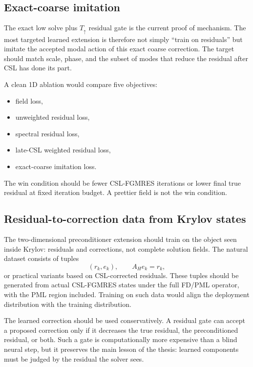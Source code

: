 \subsection{Exact-coarse imitation}
\label{subsec:discussion-future-exact-coarse}

The exact low solve plus $T_\uparrow$ residual gate is the current proof of
mechanism. The most targeted learned extension is therefore not simply
``train on residuals'' but imitate the accepted modal action of this exact
coarse correction. The target should match scale, phase, and the subset of
modes that reduce the residual after CSL has done its part.

A clean 1D ablation would compare five objectives:
\begin{itemize}
    \item field loss,
    \item unweighted residual loss,
    \item spectral residual loss,
    \item late-CSL weighted residual loss,
    \item exact-coarse imitation loss.
\end{itemize}
The win condition should be fewer CSL-FGMRES iterations or lower final true
residual at fixed iteration budget. A prettier field is not the win condition.

\subsection{Residual-to-correction data from Krylov states}
\label{subsec:discussion-future-rescorr}

The two-dimensional preconditioner extension should train on the object seen
inside Krylov: residuals and corrections, not complete solution fields. The
natural dataset consists of tuples
\[
    (r_k, e_k),
    \qquad
    A_H e_k = r_k,
\]
or practical variants based on CSL-corrected residuals. These tuples should be
generated from actual CSL-FGMRES states under the full FD/PML operator, with
the PML region included. Training on such data would align the deployment
distribution with the training distribution.

The learned correction should be used conservatively. A residual gate can
accept a proposed correction only if it decreases the true residual, the
preconditioned residual, or both. Such a gate is computationally more
expensive than a blind neural step, but it preserves the main lesson of the
thesis: learned components must be judged by the residual the solver sees.

